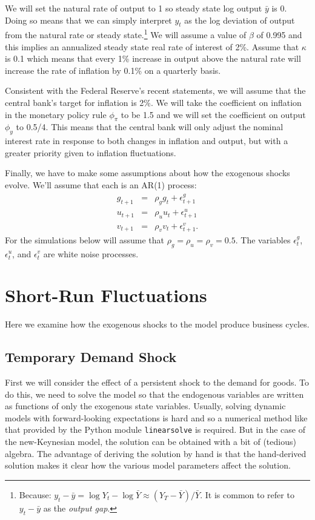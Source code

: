 \documentclass[12pt,fleqn]{article}
\newcommand{\EE}{\begin{eqnarray}}
\newcommand{\FF}{\end{eqnarray}}
\begin{document}
We will set the natural rate of output to 1 so steady state log output $\bar{y}$ is 0. Doing so means that we can simply interpret $y_t$ as the log deviation of output from the natural rate or steady state.\footnote{Because: $y_t - \bar{y} = \log Y_t - \log \bar{Y} \approx (Y_T - \bar{Y})/\bar{Y}$. It is common to refer to $y_t - \bar{y}$ as the \emph{output gap}.} We will assume a value of $\beta$ of 0.995 and this implies an annualized steady state real rate of interest of 2\%. Assume that $\kappa$ is 0.1 which means that every 1\% increase in output above the natural rate will increase the rate of inflation by 0.1\% on a quarterly basis.
	
Consistent with the Federal Reserve's recent statements, we will assume that the central bank's target for inflation is 2\%. We will take the coefficient on inflation in the monetary policy rule $\phi_{\pi}$ to be 1.5 and we will set the coefficient on output $\phi_y$ to 0.5/4. This means that the central bank will only adjust the nominal interest rate in response to both changes in inflation and output, but with a greater priority given to inflation fluctuations.

Finally, we have to make some assumptions about how the exogenous shocks evolve. We'll assume that each is an AR(1) process:
	\EE
	g_{t+1} & = & \rho_g g_{t} + \epsilon^g_{t+1}\\
	u_{t+1} & = & \rho_u u_{t} + \epsilon^u_{t+1}\\
	v_{t+1} & = & \rho_v v_{t} + \epsilon^v_{t+1}.
	\FF
For the simulations below will assume that $\rho_g = \rho_u =\rho_v = 0.5$. The variables $\epsilon^g_t$, $\epsilon^u_t$, and $\epsilon^v_t$ are white noise processes.


\section{Short-Run Fluctuations}

Here we examine how the exogenous shocks to the model produce business cycles.

\subsection{Temporary Demand Shock}

First we will consider the effect of a persistent shock to the demand for goods. To do this, we need to solve the model so that the endogenous variables are written as functions of only the exogenous state variables. Usually, solving dynamic models with forward-looking expectations is hard and so a numerical method like that provided by the Python module \verb=linearsolve= is required. But in the case of the new-Keynesian model, the solution can be obtained with a bit of (tedious) algebra. The advantage of deriving the solution by hand is that the hand-derived solution makes it clear how the various model parameters affect the solution.
\end{document}
